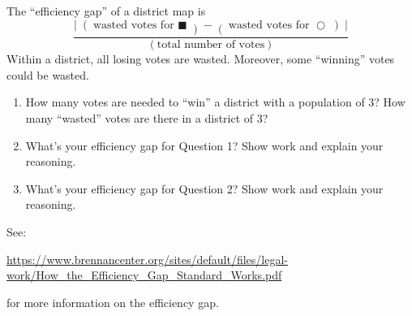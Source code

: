 \documentclass[noauthor,nooutcomes,hints,handout,12pt]{ximera}
\begin{document}
\begin{question}
  The ``efficiency gap'' of a district map is
  \[
  \frac{\left|\right(\text{wasted votes for }\blacksquare\left) - \right(\text{wasted votes for }\bigcirc\left)\right|}{(\text{total number of votes})}
  \]
  Within a district, all losing votes are wasted. Moreover, some ``winning'' votes could be wasted.
  \begin{enumerate}
    \item How many votes are needed to ``win'' a district with a
      population of $3$? How many ``wasted'' votes are there in a district of $3$?
    \item What's your efficiency gap for Question 1? Show work and
      explain your reasoning.
    \item What's your efficiency gap for Question 2? Show work and
      explain your reasoning.
  \end{enumerate}
\end{question}
See:
\begin{center}
  \url{https://www.brennancenter.org/sites/default/files/legal-work/How\_the\_Efficiency\_Gap\_Standard\_Works.pdf}
\end{center}
for more information on the efficiency gap.
\end{document}
